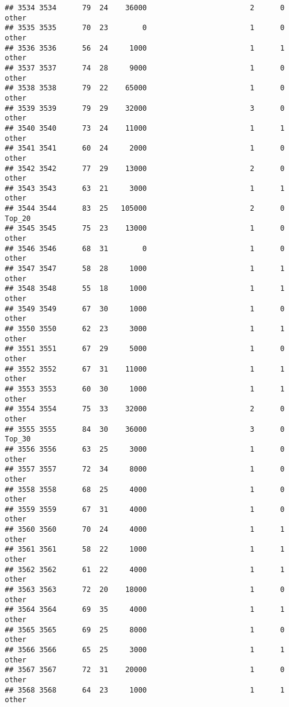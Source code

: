 \documentclass[
]{article}
\begin{document}
\begin{verbatim}
## 3534 3534      79  24    36000                        2      0    other
## 3535 3535      70  23        0                        1      0    other
## 3536 3536      56  24     1000                        1      1    other
## 3537 3537      74  28     9000                        1      0    other
## 3538 3538      79  22    65000                        1      0    other
## 3539 3539      79  29    32000                        3      0    other
## 3540 3540      73  24    11000                        1      1    other
## 3541 3541      60  24     2000                        1      0    other
## 3542 3542      77  29    13000                        2      0    other
## 3543 3543      63  21     3000                        1      1    other
## 3544 3544      83  25   105000                        2      0   Top_20
## 3545 3545      75  23    13000                        1      0    other
## 3546 3546      68  31        0                        1      0    other
## 3547 3547      58  28     1000                        1      1    other
## 3548 3548      55  18     1000                        1      1    other
## 3549 3549      67  30     1000                        1      0    other
## 3550 3550      62  23     3000                        1      1    other
## 3551 3551      67  29     5000                        1      0    other
## 3552 3552      67  31    11000                        1      1    other
## 3553 3553      60  30     1000                        1      1    other
## 3554 3554      75  33    32000                        2      0    other
## 3555 3555      84  30    36000                        3      0   Top_30
## 3556 3556      63  25     3000                        1      0    other
## 3557 3557      72  34     8000                        1      0    other
## 3558 3558      68  25     4000                        1      0    other
## 3559 3559      67  31     4000                        1      0    other
## 3560 3560      70  24     4000                        1      1    other
## 3561 3561      58  22     1000                        1      1    other
## 3562 3562      61  22     4000                        1      1    other
## 3563 3563      72  20    18000                        1      0    other
## 3564 3564      69  35     4000                        1      1    other
## 3565 3565      69  25     8000                        1      0    other
## 3566 3566      65  25     3000                        1      1    other
## 3567 3567      72  31    20000                        1      0    other
## 3568 3568      64  23     1000                        1      1    other

\end{verbatim}
\end{document}

